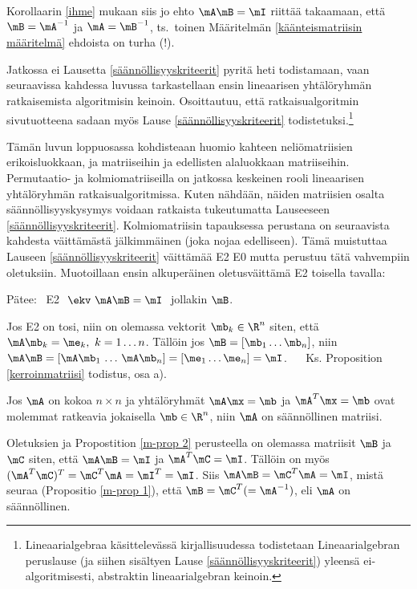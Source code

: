 Korollaarin \ref{ihme} mukaan siis jo ehto $\mA\mB=\mI$ riittää takaamaan, että $\mB=\mA^{-1}$
ja $\mA=\mB^{-1}$, ts.\ toinen Määritelmän \ref{käänteismatriisin määritelmä} ehdoista on
turha (!).

Jatkossa ei Lausetta \ref{säännöllisyyskriteerit} pyritä heti todistamaan, vaan seuraavissa
kahdessa luvussa tarkastellaan ensin lineaarisen yhtälöryhmän ratkaisemista algoritmisin
keinoin. Osoittautuu, että ratkaisualgoritmin sivutuotteena sadaan myös Lause
\ref{säännöllisyyskriteerit} todistetuksi.\footnote[2]{Lineaarialgebraa käsittelevässä
kirjallisuudessa todistetaan Lineaarialgebran peruslause (ja siihen sisältyen Lause
\ref{säännöllisyyskriteerit}) yleensä ei-algoritmisesti, abstraktin lineaarialgebran keinoin.}

Tämän luvun loppuosassa kohdisteaan huomio kahteen neliömatriisien erikoisluokkaan,
 ja matriiseihin ja edellisten alaluokkaan
matriiseihin. Permutaatio- ja kolmiomatriiseilla on jatkossa keskeinen rooli
lineaarisen yhtälöryhmän ratkaisualgoritmissa. Kuten nähdään, näiden matriisien osalta
säännöllisyyskysymys voidaan ratkaista tukeutumatta Lauseeseen \ref{säännöllisyyskriteerit}.
Kolmiomatriisin tapauksessa perustana on seuraavista kahdesta väittämästä jälkimmäinen (joka
nojaa edelliseen). Tämä muistuttaa Lauseen \ref{säännöllisyyskriteerit} väittämää E2\,\impl\,E0
mutta perustuu tätä vahvempiin oletuksiin. Muotoillaan ensin alkuperäinen oletusväittämä E2
toisella tavalla:
\begin{Prop} \label{m-prop 2} Pätee: \ E2 $\ \ekv\ \mA\mB=\mI\ $ jollakin $\mB$.
\end{Prop}
\tod \fbox{$\impl$} Jos E2 on tosi, niin on olemassa vektorit $\mb_k\in\R^n$ siten, että 
$\mA\mb_k=\me_k,\ k=1 \ldots n$. Tällöin jos $\mB=[\mb_1 \ldots \mb_n]$, niin 
$\mA\mB = [\mA\mb_1\,\ldots\,\mA\mb_n] = [\me_1 \ldots \me_n] = \mI$. \
\fbox{$\Leftarrow$} \ Ks. Proposition \ref{kerroinmatriisi} todistus, osa a). \loppu
\begin{Prop} \label{m-prop 3} Jos $\mA$ on kokoa $n \times n$ ja yhtälöryhmät $\mA\mx=\mb$
ja $\mA^T\mx=\mb$ ovat molemmat ratkeavia jokaisella $\mb\in\R^n$, niin $\mA$ on säännöllinen
matriisi.
\end{Prop}
\tod Oletuksien ja Propostition \ref{m-prop 2} perusteella on olemassa matriisit $\mB$ ja $\mC$
siten, että $\mA\mB=\mI$ ja $\mA^T\mC=\mI$. Tällöin on myös $(\mA^T\mC)^T=\mC^T\mA=\mI^T=\mI$.
Siis $\mA\mB=\mC^T\mA=\mI$, mistä seuraa (Propositio \ref{m-prop 1}), että
$\mB=\mC^T (=\mA^{-1})$, eli $\mA$ on säännöllinen. \loppu 
 
